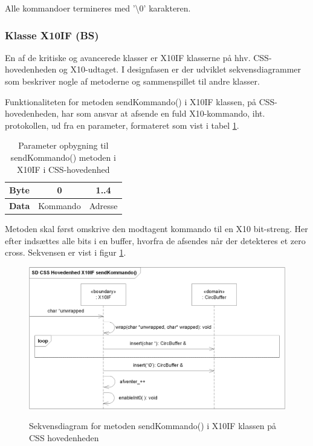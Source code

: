 Alle kommandoer termineres med '\textbackslash 0' karakteren. 

\subsubsection{Klasse X10IF (BS)}
En af de kritiske og avancerede klasser er X10IF klasserne på hhv. CSS-hovedenheden og X10-udtaget. I designfasen er der udviklet sekvensdiagrammer som beskriver nogle af metoderne og sammenspillet til andre klasser.

Funktionaliteten for metoden sendKommando() i X10IF klassen, på CSS-hovedenheden, har som ansvar at afsende en fuld X10-kommando, iht. protokollen, ud fra en parameter, formateret som vist i tabel \ref{table:X10_sendKommando_format}.

\begin{table}[h]
	\caption{Parameter opbygning til sendKommando() metoden i X10IF i CSS-hovedenhed}
	\centering
	\begin{tabular}{|c|c|c|}
		\hline 
		\textbf{Byte} & 0 & 1..4 \\ \hline
		\textbf{Data} & Kommando & Adresse \\ 
		\hline 
	\end{tabular} 
	\label{table:X10_sendKommando_format}
\end{table}

Metoden skal først omskrive den modtagent kommando til en X10 bit-streng. Her efter indsættes alle bits i en buffer, hvorfra de afsendes når der detekteres et zero cross. 
Sekvensen er vist i figur \ref{fig:X10_sendKommando_sd}.

\begin{figure}[!htb]
     {\includegraphics[width=\textwidth]{billeder/uml/CSS_X10IF_sendKommando_SD}}
     \caption{Sekvensdiagram for metoden sendKommando() i X10IF klassen på CSS hovedenheden}
     \label{fig:X10_sendKommando_sd}
\end{figure}


